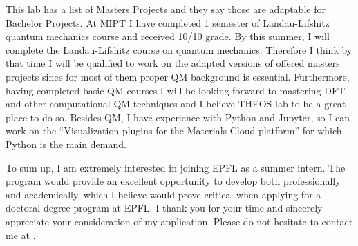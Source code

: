 \documentclass[12pt, a4paper]{awesome-cv}
\begin{document}
\begin{cvletter}
This lab has a list of Masters Projects and they say those are adaptable for Bachelor Projects. At MIPT I have completed 1 semester of Landau-Lifshitz quantum mechanics course and received 10/10 grade. By this summer, I will complete the Landau-Lifshitz course on quantum mechanics. Therefore I think by that time I will be qualified to work on the adapted versions of offered masters projects since for most of them proper QM background is essential. Furthermore, having completed basic QM courses I will be looking forward to mastering DFT and other computational QM techniques and I believe THEOS lab to be a great place to do so. Besides QM, I have experience with Python and Jupyter, so I can work on the “Visualization plugins for the Materials Cloud platform” for which Python is the main demand.


\end{cvletter}



To sum up, I am extremely interested in joining EPFL as a summer intern. The program would provide an excellent opportunity to develop both professionally and academically, which I believe would prove critical when applying for a doctoral degree program at EPFL. I thank you for your time and sincerely appreciate your consideration of my application. Please do not hesitate to contact me at \href{polyachenko.yua@phystech.edu}.


\makeletterclosing
\end{document}
